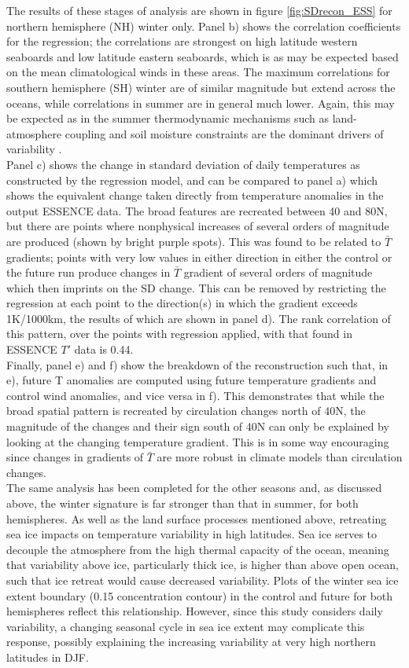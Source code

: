 \documentclass [11pt,a4paper,twosided] {report}
\begin{document}
The results of these stages of analysis are shown in figure \ref{fig:SDrecon_ESS} for northern hemisphere (NH) winter only. Panel b) shows the correlation coefficients for the regression; the correlations are strongest on high latitude western seaboards and low latitude eastern seaboards, which is as may be expected based on the mean climatological winds in these areas. The maximum correlations for southern hemisphere (SH) winter are of similar magnitude but extend across the oceans, while correlations in summer are in general much lower. Again, this may be expected as in the summer thermodynamic mechanisms such as land-atmosphere coupling and soil moisture constraints are the dominant drivers of variability \citep{FischerSchar}.\\
Panel c) shows the change in standard deviation of daily temperatures as constructed by the regression model, and can be compared to panel a) which shows the equivalent change taken directly from temperature anomalies in the output ESSENCE data. The broad features are recreated between 40 and 80N, but there are points where nonphysical increases of several orders of magnitude are produced (shown by bright purple spots). This was found to be related to $\bar{T}$ gradients; points with very low values in either direction in either the control or the future run produce changes in $\bar{T}$ gradient of several orders of magnitude which then imprints on the SD change. This can be removed by restricting the regression at each point to the direction(s) in which the gradient exceeds 1K/1000km, the results of which are shown in panel d). The rank correlation of this pattern, over the points with regression applied, with that found in ESSENCE $T'$ data is 0.44.\\
Finally, panel e) and f) show the breakdown of the reconstruction such that, in e), future T anomalies are computed using future temperature gradients and control wind anomalies, and vice versa in f). This demonstrates that while the broad spatial pattern is recreated by circulation changes north of 40N, the magnitude of the changes and their sign south of 40N can only be explained by looking at the changing temperature gradient. This is in some way encouraging since changes in gradients of $\bar{T}$ are more robust in climate models than circulation changes. \\ 
The same analysis has been completed for the other seasons and, as discussed above, the winter signature is far stronger than that in summer, for both hemispheres. As well as the land surface processes mentioned above, retreating sea ice impacts on temperature variability in high latitudes. Sea ice serves to decouple the atmosphere from the high thermal capacity of the ocean, meaning that variability above ice, particularly thick ice, is higher than above open ocean, such that ice retreat would cause decreased variability. Plots of the winter sea ice extent boundary (0.15 concentration contour) in the control and future for both hemispheres reflect this relationship. However, since this study considers daily variability, a changing seasonal cycle in sea ice extent may complicate this response, possibly explaining the increasing variability at very high northern latitudes in DJF. \\
\end{document}
